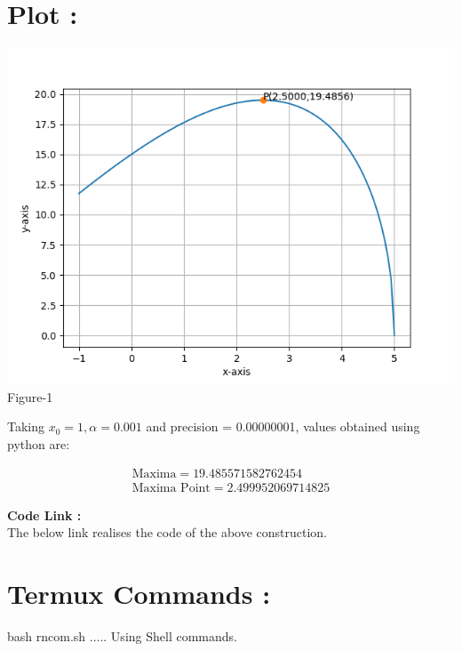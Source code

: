 \documentclass[10pt,a4paper]{report}
\begin{document}
\section{Plot :}
\begin{center}
  \includegraphics[scale=0.55]{optimization.png}
  Figure-1
  \end{center}



Taking $x_0=1,\alpha=0.001$ and precision = 0.00000001, values obtained using python are:
    
    \begin{align}
        \boxed{\text{Maxima} = 19.485571582762454}\\
        \boxed{\text{Maxima Point} = 2.499952069714825}
    \end{align}
    
\raggedright \textbf{Code Link :}\\ \vspace{2mm}
The below link realises the code of the above construction.\\
\begin{center}
\end{center}

\section{Termux Commands :}
\centering bash rncom.sh ..... Using Shell commands.

\end{document}
